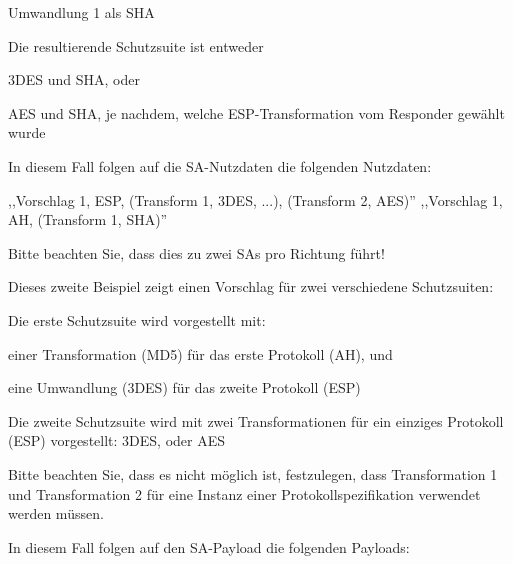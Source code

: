 \documentclass[a4paper]{article}
\begin{document}
\begin{multicols}{3}
\begin{itemize*}
\begin{itemize*}
                  \begin{itemize*}
                        \item Umwandlung 1 als SHA
                  \end{itemize*}
                  \item Die resultierende Schutzsuite ist entweder
                  \begin{itemize*}
                        \item 3DES und SHA, oder
                        \item AES und SHA, je nachdem, welche ESP-Transformation vom Responder gewählt wurde
                  \end{itemize*}
                  \item In diesem Fall folgen auf die SA-Nutzdaten die folgenden Nutzdaten:
                  \begin{itemize*}
                        \item ,,Vorschlag 1, ESP, (Transform 1, 3DES, ...), (Transform 2, AES)'' ,,Vorschlag 1, AH, (Transform 1, SHA)''
                  \end{itemize*}
                  \item Bitte beachten Sie, dass dies zu zwei SAs pro Richtung führt!
            \end{itemize*}
            \item Dieses zweite Beispiel zeigt einen Vorschlag für zwei verschiedene
            Schutzsuiten:
            \begin{itemize*}
                  \item Die erste Schutzsuite wird vorgestellt mit:
                  \begin{itemize*}
                        \item einer Transformation (MD5) für das erste Protokoll (AH), und
                        \item eine Umwandlung (3DES) für das zweite Protokoll (ESP)
                  \end{itemize*}
                  \item Die zweite Schutzsuite wird mit zwei Transformationen für ein einziges Protokoll (ESP) vorgestellt: 3DES, oder AES
                  \item Bitte beachten Sie, dass es nicht möglich ist, festzulegen, dass Transformation 1 und Transformation 2 für eine Instanz einer Protokollspezifikation verwendet werden müssen.
                  \item In diesem Fall folgen auf den SA-Payload die folgenden Payloads:

\end{itemize*}
\end{itemize*}
\end{multicols}
\end{document}
